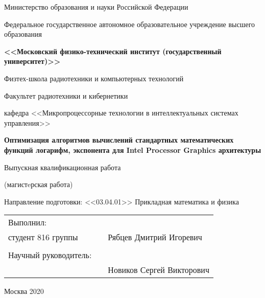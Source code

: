 \begin{titlepage}
	\begin{center}
    	Министерство образования и науки Российской Федерации
		
		\vspace{1cm}
		
		Федеральное государственное автономное образовательное учреждение высшего образования
		 
		\textbf{<<Московский физико-технический институт (государственный университет)>>}
		
		\vspace{1cm}
		
		Физтех-школа радиотехники и компьютерных технологий

		Факультет радиотехники и кибернетики
		
		\vspace{1cm}
		
		кафедра <<Микропроцессорные технологии в интеллектуальных 
		системах управления>>
		
		\vfill
		\textbf{\Large Оптимизация алгоритмов вычислений стандартных
		математических функций логарифм, экспонента для Intel Processor Graphics архитектуры}
		
		\vspace{1cm}
		
		Выпускная квалификационная работа
		
		(магистeрская работа)
		
		\vspace{1cm}		
		
		Направление подготовки: <<03.04.01>> Прикладная математика и
		физика

	\end{center}
	\vfill

	\begin{tabular}{lrl}
		Выполнил: & & \\
		студент 816 группы & \hfill \underline{\hspace{5cm}} & Рябцев Дмитрий Игоревич \\
		& & \\
		Научный руководитель: & & \\
		& \hfill \underline{\hspace{5cm}} & Новиков Сергей Викторович
	\end{tabular}
	\vfill
 
	\begin{center}
  		Москва 2020
	\end{center}
\end{titlepage}
